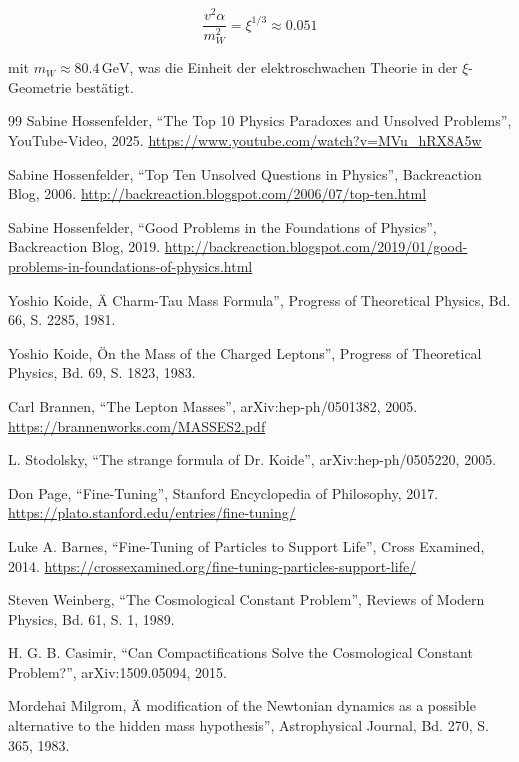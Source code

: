 	\begin{equation}
		\frac{v^2 \alpha}{m_W^2} = \xi^{1/3} \approx 0.051
	\end{equation}
	
	mit $m_W \approx 80.4\,\si{\giga\electronvolt}$, was die Einheit der elektroschwachen Theorie in der $\xi$-Geometrie bestätigt.

	\begin{thebibliography}{99}
		 Sabine Hossenfelder, ``The Top 10 Physics Paradoxes and Unsolved Problems'', YouTube-Video, 2025. \url{https://www.youtube.com/watch?v=MVu_hRX8A5w}
		
		 Sabine Hossenfelder, ``Top Ten Unsolved Questions in Physics'', Backreaction Blog, 2006. \url{http://backreaction.blogspot.com/2006/07/top-ten.html}
		
		 Sabine Hossenfelder, ``Good Problems in the Foundations of Physics'', Backreaction Blog, 2019. \url{http://backreaction.blogspot.com/2019/01/good-problems-in-foundations-of-physics.html}
		
		 Yoshio Koide, Ä Charm-Tau Mass Formula'', Progress of Theoretical Physics, Bd. 66, S. 2285, 1981.
		
		 Yoshio Koide, Ön the Mass of the Charged Leptons'', Progress of Theoretical Physics, Bd. 69, S. 1823, 1983.
		
		 Carl Brannen, ``The Lepton Masses'', arXiv:hep-ph/0501382, 2005. \url{https://brannenworks.com/MASSES2.pdf}
		
		 L. Stodolsky, ``The strange formula of Dr. Koide'', arXiv:hep-ph/0505220, 2005.
		
		 Don Page, ``Fine-Tuning'', Stanford Encyclopedia of Philosophy, 2017. \url{https://plato.stanford.edu/entries/fine-tuning/}
		
		 Luke A. Barnes, ``Fine-Tuning of Particles to Support Life'', Cross Examined, 2014. \url{https://crossexamined.org/fine-tuning-particles-support-life/}
		
		 Steven Weinberg, ``The Cosmological Constant Problem'', Reviews of Modern Physics, Bd. 61, S. 1, 1989.
		
		 H. G. B. Casimir, ``Can Compactifications Solve the Cosmological Constant Problem?'', arXiv:1509.05094, 2015.
		
		 Mordehai Milgrom, Ä modification of the Newtonian dynamics as a possible alternative to the hidden mass hypothesis'', Astrophysical Journal, Bd. 270, S. 365, 1983.
		

\end{thebibliography}
